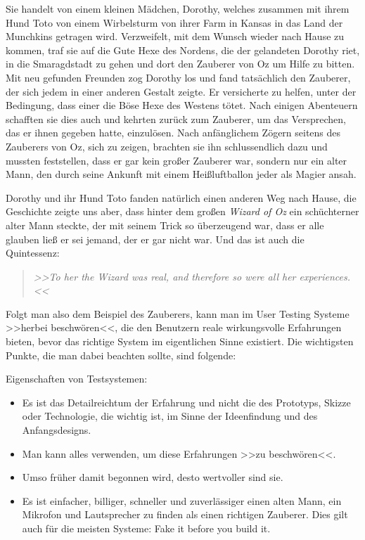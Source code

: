 Sie handelt von einem kleinen Mädchen, Dorothy, welches zusammen mit ihrem Hund Toto von einem Wirbelsturm von ihrer Farm in Kansas in das Land der Munchkins getragen wird. Verzweifelt, mit dem Wunsch wieder nach Hause zu kommen, traf sie auf die Gute Hexe des Nordens, die der gelandeten Dorothy riet, in die Smaragdstadt zu gehen und dort den Zauberer von Oz um Hilfe zu bitten. Mit neu gefunden Freunden zog Dorothy los und fand tatsächlich den Zauberer, der sich jedem in einer anderen Gestalt zeigte. Er versicherte zu helfen, unter der Bedingung, dass einer die Böse Hexe des Westens tötet. Nach einigen Abenteuern schafften sie dies auch und kehrten zurück zum Zauberer, um das Versprechen, das er ihnen gegeben hatte, einzulösen. Nach anfänglichem Zögern seitens des Zauberers von Oz, sich zu zeigen, brachten sie ihn schlussendlich dazu und mussten feststellen, dass er gar kein großer Zauberer war, sondern nur ein alter Mann, den durch seine Ankunft mit einem Heißluftballon jeder als Magier ansah. \citep{Baum:2008}

\medskip Dorothy und ihr Hund Toto fanden natürlich einen anderen Weg nach Hause, die Geschichte zeigte uns aber, dass hinter dem großen \emph{Wizard of Oz} ein schüchterner alter Mann steckte, der mit seinem Trick so überzeugend war, dass er alle glauben ließ er sei jemand, der er gar nicht war. Und das ist auch die Quintessenz: 

\begin{quote}
	\textsl{>>To her the Wizard was real, and therefore so were all her experiences.<<}
\begin{flushright}\citep{Buxton:2007}\end{flushright}
\end{quote}

Folgt man also dem Beispiel des Zauberers, kann man im User Testing Systeme >>herbei beschwören<<, die den Benutzern reale wirkungsvolle Erfahrungen bieten, bevor das richtige System im eigentlichen Sinne existiert. Die wichtigsten Punkte, die man dabei beachten sollte, sind folgende:

\medskip Eigenschaften von Testsystemen:
\begin{itemize}
	\item Es ist das Detailreichtum der Erfahrung und nicht die des Prototyps, Skizze oder Technologie, die wichtig ist, im Sinne der Ideenfindung und des Anfangsdesigns.
	\item Man kann alles verwenden, um diese Erfahrungen >>zu beschwören<<.
	\item Umso früher damit begonnen wird, desto wertvoller sind sie.
	\item Es ist einfacher, billiger, schneller und zuverlässiger einen alten Mann, ein Mikrofon und Lautsprecher zu finden als einen richtigen Zauberer. Dies gilt auch für die meisten Systeme:  Fake it before you build it.
\end{itemize}
\begin{flushright}\citep{Buxton:2007}\end{flushright}
	
